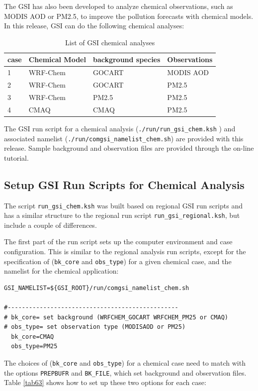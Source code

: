 The GSI has also been developed to analyze chemical observations, such as MODIS AOD or PM2.5, to improve the pollution forecasts with chemical models. 
In this release, GSI can do the following chemical analyses:

\begin{table}[htbp]
\centering
\caption{List of GSI chemical analyses}
\begin{tabular}{|p{1cm}|p{3cm}|p{4cm}|p{3cm}|}
\hline
case&Chemical Model &background species & Observations\\
\hline
1&WRF-Chem &  GOCART & MODIS AOD \\
\hline
2&WRF-Chem &  GOCART & PM2.5 \\
\hline
3&WRF-Chem &  PM2.5 & PM2.5 \\
\hline
4&CMAQ &  CMAQ & PM2.5 \\
\hline
\end{tabular}
\label{tab62}
\end{table} 

The GSI run script for a chemical analysis (\verb|./run/run_gsi_chem.ksh| ) and associated namelist (\verb|./run/comgsi_namelist_chem.sh|) are provided with this release. 
Sample background and observation files are provided through the on-line tutorial. 

\subsection{Setup GSI Run Scripts for Chemical Analysis}

The script \verb|run_gsi_chem.ksh| was built based on regional GSI run scripts and has a similar structure to the regional run script \verb|run_gsi_regional.ksh|, 
but include a couple of differences.

The first part of the run script sets up the computer environment and case configuration. This is similar to the regional analysis run scripts, except 
for the specification of (\verb|bk_core| and \verb|obs_type|) for a given chemical case, and the namelist for the chemical application:
\begin{scriptsize}
\begin{verbatim}
GSI_NAMELIST=${GSI_ROOT}/run/comgsi_namelist_chem.sh

#------------------------------------------------
# bk_core= set background (WRFCHEM_GOCART WRFCHEM_PM25 or CMAQ)
# obs_type= set observation type (MODISAOD or PM25)
  bk_core=CMAQ
  obs_type=PM25
\end{verbatim}
\end{scriptsize}
The choices of (\verb|bk_core| and \verb|obs_type|) for a chemical case need to match with the options \verb|PREPBUFR| and \verb|BK_FILE|, which set background and observation files. Table \ref{tab63} shows how to set up these two options for each case:

